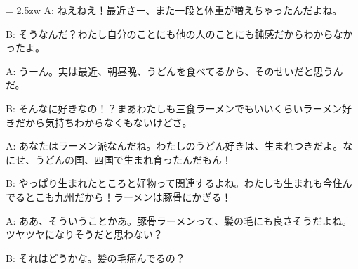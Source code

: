 \documentclass[11pt]{amsart}
\title{}
\author{}
\newenvironment{hangall}[1]{\hangindent = 2.5zw\everypar{\hangindent = 2.5zw}}{}
\begin{document}
\maketitle
\begin{hangall}{}%
A: ねえねえ！最近さー、また一段と体重が増えちゃったんだよね。

B: そうなんだ？わたし自分のことにも他の人のことにも鈍感だからわからなかったよ。

A: うーん。実は最近、朝昼晩、うどんを食べてるから、そのせいだと思うんだ。

B: そんなに好きなの！？まあわたしも三食ラーメンでもいいくらいラーメン好きだから気持ちわからなくもないけどさ。

A: あなたはラーメン派なんだね。わたしのうどん好きは、生まれつきだよ。なにせ、うどんの国、四国で生まれ育ったんだもん！

B: やっぱり生まれたところと好物って関連するよね。わたしも生まれも今住んでるとこも九州だから！ラーメンは豚骨にかぎる！

A: ああ、そういうことかあ。豚骨ラーメンって、髪の毛にも良さそうだよね。ツヤツヤになりそうだと思わない？

B: \ul{それはどうかな。髪の毛痛んでるの？}\end{hangall}
\end{document}
